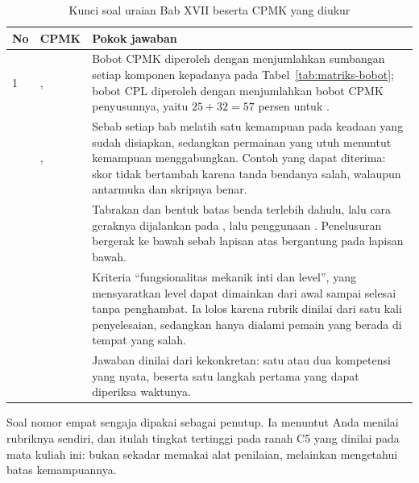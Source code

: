 \begin{table}[htbp]
\centering
\caption{Kunci soal uraian Bab XVII beserta CPMK yang diukur}
\label{tab:kunci-uraian-ch17}
{\setlength{\tabcolsep}{4pt}\footnotesize%
\begin{tabularx}{\textwidth}{@{}C{0.8cm} C{1.7cm} Y@{}}
\toprule
\headrow \textbf{No} & \textbf{CPMK} & \textbf{Pokok jawaban} \\
 & ,  &
Bobot CPMK diperoleh dengan menjumlahkan sumbangan setiap komponen kepadanya
pada Tabel~\ref{tab:matriks-bobot}; bobot CPL diperoleh dengan menjumlahkan
bobot CPMK penyusunnya, yaitu $25 + 32 = 57$ persen untuk . \\
 & ,  &
Sebab setiap bab melatih satu kemampuan pada keadaan yang sudah disiapkan,
sedangkan permainan yang utuh menuntut kemampuan menggabungkan. Contoh yang
dapat diterima: skor tidak bertambah karena tanda bendanya salah, walaupun
antarmuka dan skripnya benar. \\
 &  &
Tabrakan dan bentuk batas benda terlebih dahulu, lalu cara geraknya dijalankan
pada , lalu penggunaan . Penelusuran
bergerak ke bawah sebab lapisan atas bergantung pada lapisan bawah. \\
 &  &
Kriteria ``fungsionalitas mekanik inti dan level'', yang mensyaratkan level
dapat dimainkan dari awal sampai selesai tanpa penghambat. Ia lolos karena
rubrik dinilai dari satu kali penyelesaian, sedangkan  hanya
dialami pemain yang berada di tempat yang salah. \\
 &  &
Jawaban dinilai dari kekonkretan: satu atau dua kompetensi yang nyata, beserta
satu langkah pertama yang dapat diperiksa waktunya. \\
\bottomrule
\end{tabularx}}
\end{table}

\begin{catatabox}
Soal nomor empat sengaja dipakai sebagai penutup. Ia menuntut Anda menilai
rubriknya sendiri, dan itulah tingkat tertinggi pada ranah C5 yang dinilai
pada mata kuliah ini: bukan sekadar memakai alat penilaian, melainkan
mengetahui batas kemampuannya.
\end{catatabox}
